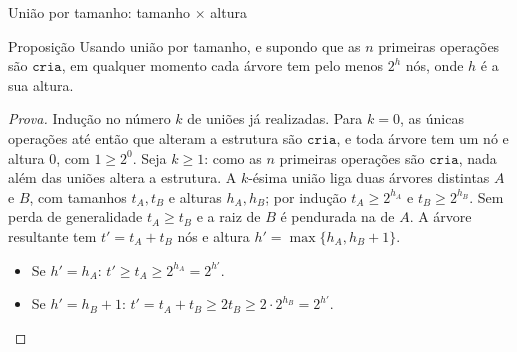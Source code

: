 \documentclass[aspectratio=169,10pt]{beamer}
\newcommand{\Cria}{\mathtt{cria}}
\begin{document}
\begin{frame}[t]{União por tamanho: tamanho $\times$ altura}
  \small
  \begin{block}{Proposição}
    Usando união por tamanho, e supondo que as $n$ primeiras operações
    são $\Cria$, em qualquer momento cada árvore tem pelo menos $2^h$
    nós, onde $h$ é a sua altura.
  \end{block}
  \begin{proof}[Prova]
    \footnotesize
    Indução no número $k$ de uniões já realizadas.  Para $k=0$, as
    únicas operações até então que alteram a estrutura são $\Cria$, e
    toda árvore tem um nó e altura $0$, com $1\geq2^0$.  Seja $k\geq1$:
    como as $n$ primeiras operações são $\Cria$, nada além das uniões
    altera a estrutura.  A $k$-ésima união liga duas árvores distintas
    $A$ e $B$, com tamanhos $t_A,t_B$ e alturas $h_A,h_B$; por indução
    $t_A\geq2^{h_A}$ e $t_B\geq2^{h_B}$.  Sem perda de generalidade
    $t_A\geq t_B$ e a raiz de $B$ é pendurada na de $A$.  A árvore
    resultante tem $t'=t_A+t_B$ nós e altura $h'=\max\{h_A,h_B+1\}$.
    \begin{itemize}
    \item Se $h'=h_A$: $t'\geq t_A\geq2^{h_A}=2^{h'}$.
    \item Se $h'=h_B+1$: $t'=t_A+t_B\geq2t_B\geq2\cdot2^{h_B}=2^{h'}$.
    \end{itemize}
  \end{proof}
\end{frame}
\end{document}
